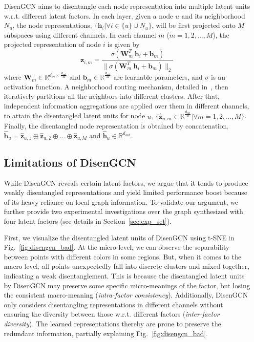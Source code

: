 \documentclass[accepted]{uai2021} %
\begin{document}
DisenGCN aims to disentangle each node representation into multiple latent units w.r.t. different latent factors. In each layer, given a node $u$ and its neighborhood $N_u$, the node representations, $\{\mathbf{h}_i | \forall i \in \{u\} \cup N_u\}$, will be first projected onto $M$ subspaces using different channels. In each channel $m$ ($m = 1,2,...,M$), the projected representation of node $i$ is given by
\begin{equation}
\mathbf{z}_{i, m} = \frac{\sigma(\mathbf{W}_m^T\:\mathbf{h}_i + \mathbf{b}_m)}{\|\sigma(\mathbf{W}_m^T\:\mathbf{h}_i + \mathbf{b}_m)\|_2}
\label{eq:channels_mp}
\end{equation}
where $\mathbf{W}_m \in \mathbb{R}^{d_{in} \times \frac{d_{out}}{M}}$ and  $\mathbf{b}_m \in \mathbb{R}^\frac{d_{out}}{M}$ are learnable parameters, and $\sigma$ is an activation function.
A neighborhood routing mechanism, detailed in~\citep[Algorithm-1]{Ma2019DisentangledGC}, then iteratively partitions all the neighbors into different clusters. After that, independent information aggregations are applied over them in different channels, to attain the disentangled latent units for node $u$, $\{\hat{\mathbf{z}}_{u, m} \in \mathbb{R}^{\frac{d_{out}}{M}}| \forall m = 1,2,...,M\}$. Finally, the disentangled node representation is obtained by concatenation, $\hat{\mathbf{h}}_u = \hat{\mathbf{z}}_{u, 1} \oplus \hat{\mathbf{z}}_{u, 2} \oplus ... \oplus \hat{\mathbf{z}}_{u, M}$ and $\hat{\mathbf{h}}_u \in \mathbb{R}^{d_{out}}$.

\subsection{Limitations of DisenGCN}\label{sec:limit}
While DisenGCN reveals certain latent factors, we argue that it tends to produce weakly disentangled representations and yield limited performance boost because of its heavy reliance on local graph information. To validate our argument, we further provide two experimental investigations over the graph synthesized with four latent factors (see details in Section~\ref{sec:exp_set}).

First, we visualize the disentangled latent units of DisenGCN using t-SNE in Fig.~\ref{fig:disengcn_bad}. At the micro-level, we can observe the separability between points with different colors in some regions. But, when it comes to the macro-level, all points unexpectedly fall into discrete clusters and mixed together, indicating a weak disentanglement. This is because the disentangled latent units by DisenGCN may preserve some specific micro-meanings of the factor, but losing the consistent macro-meaning (\emph{intra-factor consistency}). Additionally, DisenGCN only considers disentangling representations in different channels without ensuring the diversity between those w.r.t. different factors (\emph{inter-factor diversity}). The learned representations thereby are prone to preserve the redundant information, partially explaining Fig.~\ref{fig:disengcn_bad}.
\end{document}
